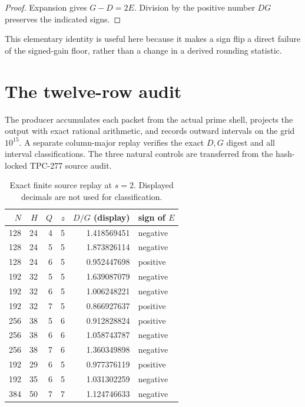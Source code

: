 \documentclass[11pt]{article}
\begin{document}
\begin{proof}
Expansion gives $G-D=2E$.  Division by the positive number $DG$ preserves
the indicated signs.
\end{proof}

This elementary identity is useful here because it makes a sign flip a
direct failure of the signed-gain floor, rather than a change in a derived
rounding statistic.

\section{The twelve-row audit}

The producer accumulates each packet from the actual prime shell, projects
the output with exact rational arithmetic, and records outward intervals on
the grid $10^{15}$.  A separate column-major replay verifies the exact
$D,G$ digest and all interval classifications.  The three natural controls
are transferred from the hash-locked TPC-277 source audit.

\begin{table}[h]
\centering
\scriptsize
\begin{tabular}{r r r r r l}
\toprule
$N$ & $H$ & $Q$ & $z$ & $D/G$ (display) & sign of $E$\\
\midrule
128 & 24 & 4 & 5 & 1.418569451 & negative\\
128 & 24 & 5 & 5 & 1.873826114 & negative\\
128 & 24 & 6 & 5 & 0.952447698 & positive\\
192 & 32 & 5 & 5 & 1.639087079 & negative\\
192 & 32 & 6 & 5 & 1.006248221 & negative\\
192 & 32 & 7 & 5 & 0.866927637 & positive\\
256 & 38 & 5 & 6 & 0.912828824 & positive\\
256 & 38 & 6 & 6 & 1.058743787 & negative\\
256 & 38 & 7 & 6 & 1.360349898 & negative\\
192 & 29 & 6 & 5 & 0.977376119 & positive\\
192 & 35 & 6 & 5 & 1.031302259 & negative\\
384 & 50 & 7 & 7 & 1.124746633 & negative\\
\bottomrule
\end{tabular}
\caption{Exact finite source replay at $s=2$.  Displayed decimals are not
used for classification.}
\end{table}
\end{document}

